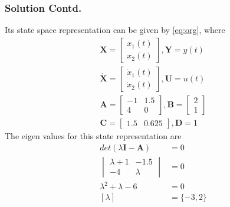 \documentclass{beamer}
\renewcommand{\vec}[1]{\mathbf{#1}}
\begin{document}
\begin{frame}
\frametitle{Solution Contd.}
Its state space representation can be given by \eqref{eq:org}, where
\begin{align}
    \vec{X}=\begin{bmatrix}
    x_1(t)\\x_2(t)
    \end{bmatrix},\vec{Y}=y(t)\\
    \vec{\dot X}=\begin{bmatrix}
    \dot x_1(t)\\\dot x_2(t)
    \end{bmatrix},\vec{U}=u(t)\\
    \vec{A}=\begin{bmatrix}
    -1 & 1.5\\
    4 & 0
    \end{bmatrix},\vec{B}=\begin{bmatrix}
    2\\
    1
    \end{bmatrix}\\
    \vec{C}=\begin{bmatrix}
    1.5 & 0.625
    \end{bmatrix},\vec{D}=1
\end{align}
The eigen values for this state representation are
\begin{align}
    det(\lambda \vec{I}-\vec{A})&=0\\
    \begin{vmatrix}
    \lambda+1 & -1.5\\
    -4 & \lambda
    \end{vmatrix}&=0\\
    \lambda^2+\lambda-6&=0\\
    [\lambda]&=\{-3,2\}
\end{align}
\end{frame}
\end{document}
